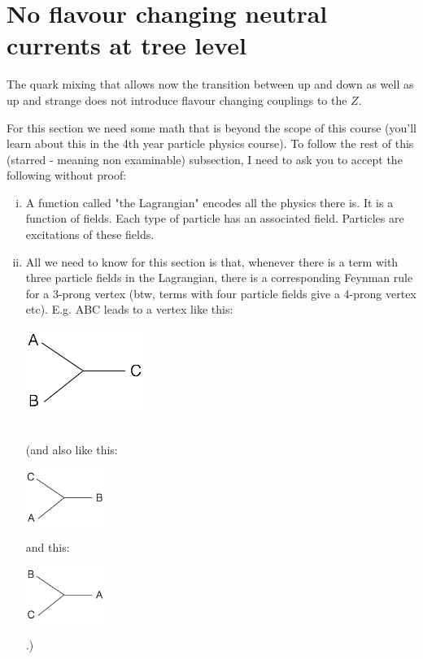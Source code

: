 \section{No flavour changing neutral currents at tree level}
\label{sec:tree_fcnc}
The quark mixing that allows now the transition between up and down as well as up and strange does not introduce flavour changing couplings to the $Z$.

For this section we need some math that is beyond the scope of this course (you'll learn about this in the 4th year particle physics course). To follow the rest of this (starred - meaning non examinable) subsection, I need to ask you to accept the following without proof:
\begin{enumerate}[i)]
\item A function called "the Lagrangian" encodes all the physics there is. It is a function of fields. Each type of particle has an associated field. Particles are excitations of these fields.
\item All we need to know for this section is that, whenever there is a term with three particle fields in the Lagrangian, there is a corresponding Feynman rule for a 3-prong vertex (btw, terms with four particle fields give a 4-prong vertex etc). E.g. ABC leads to a vertex like this:
\\
\parbox[c]{0.3\textwidth}{\includegraphics[width=0.3\textwidth]{fig/C_P_CP/ABC_vtx}}
\\
(and also like this:
\parbox[c]{0.2\textwidth}{\includegraphics[width=0.2\textwidth]{fig/C_P_CP/CAB_vtx}}
and this:
\parbox[c]{0.2\textwidth}{\includegraphics[width=0.2\textwidth]{fig/C_P_CP/BCA_vtx}}.)
\end{enumerate}

